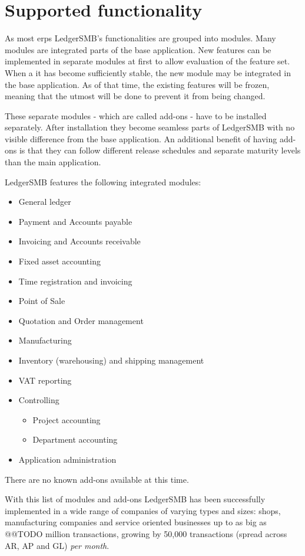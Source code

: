 \section{Supported functionality}
\label{sec-ledgersmb-modules}
As most \glspl{erp} LedgerSMB's functionalities are grouped into modules.
Many modules are integrated parts of the base application.  New features
can be implemented in separate modules at first to allow evaluation of the
feature set.  When a it has become sufficiently stable, the new module may
be integrated in the base application. As of that time, the existing features
will be frozen, meaning that the utmost will be done to prevent it from being
changed.

These separate modules - which are called \glspl{add-on} - have to be
installed separately.  After installation they become seamless parts of
LedgerSMB with no visible difference from the base application. An
additional benefit of having \glspl{add-on} is that they can follow different
release schedules and separate maturity levels than the main application.


LedgerSMB \ledgerSMBversion features the following integrated modules:

\begin{itemize}
	\item General ledger
	\item Payment and Accounts payable
	\item Invoicing and Accounts receivable
	\item Fixed asset accounting
	\item Time registration and invoicing
	\item Point of Sale
	\item Quotation and Order management
	\item Manufacturing
	\item Inventory (warehousing) and shipping management
	\item VAT reporting
	\item Controlling
	\begin{itemize}
		\item Project accounting
		\item Department accounting
	\end{itemize}
	\item Application administration
\end{itemize}

There are no known \glspl{add-on} available at this time.

With this list of modules and \glspl{add-on} LedgerSMB has been successfully
implemented in a wide range of companies of varying types and sizes: shops,
manufacturing companies and service oriented businesses up to as big as @@TODO million transactions, growing by 50,000 transactions (spread across \acrshort{AR}, \acrshort{AP} and \acrshort{GL}) \emph{per month}.


